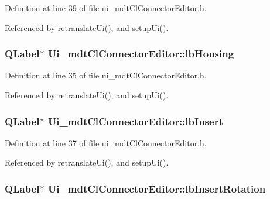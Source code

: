 Definition at line 39 of file ui\-\_\-mdt\-Cl\-Connector\-Editor.\-h.



Referenced by retranslate\-Ui(), and setup\-Ui().

\hypertarget{class_ui__mdt_cl_connector_editor_ad79151f657941d747e74ccf221bab930}{
\subsubsection[{lb\-Housing}]{\setlength{\rightskip}{0pt plus 5cm}Q\-Label$\ast$ Ui\-\_\-mdt\-Cl\-Connector\-Editor\-::lb\-Housing}}\label{class_ui__mdt_cl_connector_editor_ad79151f657941d747e74ccf221bab930}


Definition at line 35 of file ui\-\_\-mdt\-Cl\-Connector\-Editor.\-h.



Referenced by retranslate\-Ui(), and setup\-Ui().

\hypertarget{class_ui__mdt_cl_connector_editor_a13d3dc6d45de0bb9607d3607a16d11a4}{
\subsubsection[{lb\-Insert}]{\setlength{\rightskip}{0pt plus 5cm}Q\-Label$\ast$ Ui\-\_\-mdt\-Cl\-Connector\-Editor\-::lb\-Insert}}\label{class_ui__mdt_cl_connector_editor_a13d3dc6d45de0bb9607d3607a16d11a4}


Definition at line 37 of file ui\-\_\-mdt\-Cl\-Connector\-Editor.\-h.



Referenced by retranslate\-Ui(), and setup\-Ui().

\hypertarget{class_ui__mdt_cl_connector_editor_a4a5d32d675f4263f108fba4490cc7f4e}{
\subsubsection[{lb\-Insert\-Rotation}]{\setlength{\rightskip}{0pt plus 5cm}Q\-Label$\ast$ Ui\-\_\-mdt\-Cl\-Connector\-Editor\-::lb\-Insert\-Rotation}}\label{class_ui__mdt_cl_connector_editor_a4a5d32d675f4263f108fba4490cc7f4e}


